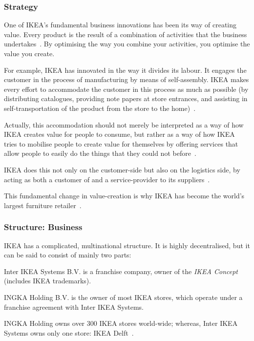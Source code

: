 \subsubsection{Strategy}
\noindent
One of IKEA's fundamental business innovations has been its way of creating value.
Every product is the result of a combination of activities that the business undertakes~\citep{normann1993}.
By optimising the way you combine your activities, you optimise the value you create.

For example, IKEA has innovated in the way it divides its labour.
It engages the customer in the process of manufacturing by means of self-assembly.
IKEA makes every effort to accommodate the customer in this process as much as possible (by distributing catalogues, providing note papers at store entrances, and assisting in self-transportation of the product from the store to the home)~\citep{normann1993}.

Actually, this accommodation should not merely be interpreted as a way of how IKEA creates value for people to consume, but rather as a way of how IKEA tries to mobilise people to create value for themselves by offering services that allow people to easily do the things that they could not before~\citep{normann1993}.

IKEA does this not only on the customer-side but also on the logistics side, by acting as both a customer of and a service-provider to its suppliers~\citep{normann1993}.

This fundamental change in value-creation is why IKEA has become the world's largest furniture retailer~\citep{normann1993}.

\subsubsection{Structure: Business}
IKEA has a complicated, multinational structure.
It is highly decentralised, but it can be said to consist of mainly two parts:
\begin{compactdesc}
    \item[Inter IKEA Systems B.V.] is a franchise company, owner of the \emph{IKEA Concept} (includes IKEA trademarks).
    \item[INGKA Holding B.V.] is the owner of most IKEA stores, which operate under a franchise agreement with Inter IKEA Systems.
\end{compactdesc}
INGKA Holding owns over 300 IKEA stores world-wide; whereas, Inter IKEA Systems owns only one store: IKEA Delft~\citep{interikea}.

